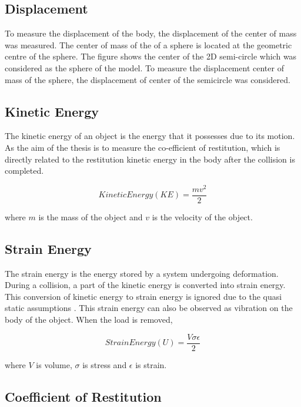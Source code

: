 \subsection{Displacement}

To measure the displacement of the body, the displacement of the center of mass was measured. The center of mass of the of a sphere is located at the geometric centre of the sphere. The figure shows the center of the 2D semi-circle which was considered as the sphere of the model. To measure the displacement center of mass of the sphere, the displacement of center of the semicircle was considered.

\subsection{Kinetic Energy}

The kinetic energy of an object is the energy that it possesses due to its motion. As the aim of the thesis is to measure the co-efficient of restitution, which is directly related to the restitution kinetic energy in the body after the collision is completed.

\begin{equation}
Kinetic Energy(KE) = \frac{mv^{2}}{2}
\end{equation}
 
 where $m$ is the mass of the object and $v$ is the velocity of the object.

\subsection{Strain Energy}

The strain energy is the energy stored by a system undergoing deformation. During a collision, a part of the kinetic energy is converted into strain energy. This conversion of kinetic energy to strain energy is ignored due to the quasi static assumptions . This strain energy can also be observed as vibration on the body of the object. When the load is removed,

\begin{equation}
Strain Energy(U) = \frac{V\sigma\epsilon}{2}
\end{equation}

where $V$ is volume, $\sigma$ is stress and $\epsilon$ is strain.

\subsection{Coefficient of Restitution}

